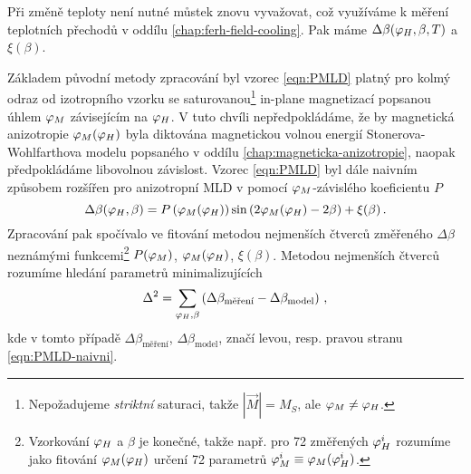 Při změně teploty není nutné můstek znovu vyvažovat, což využíváme k měření teplotních přechodů v oddílu \ref{chap:ferh-field-cooling}.
Pak máme $\Delta\beta(\varphi_H, \beta, T)$ a $\xi(\beta)$.

Základem původní metody zpracování byl vzorec \eqref{eqn:PMLD} platný pro kolmý odraz od izotropního vzorku se saturovanou\footnote{Nepožadujeme \emph{striktní} saturaci, takže $|\vec{M}|=M_S$, ale $\varphi_M\neq\varphi_H$.} in-plane magnetizací popsanou úhlem $\varphi_M$ závisejícím na $\varphi_H$.
V tuto chvíli nepředpokládáme, že by magnetická anizotropie $\varphi_M(\varphi_H)$ byla diktována magnetickou volnou energií Stonerova-Wohlfarthova modelu popsaného v oddílu \ref{chap:magneticka-anizotropie}, naopak předpokládáme libovolnou závislost.
Vzorec \eqref{eqn:PMLD} byl dále naivním způsobem rozšířen pro anizotropní MLD v \cite{wohlrathMagnetooptickaCharakterizaceSpintronickych2018} pomocí $\varphi_M$-závislého koeficientu $P$
\begin{equation}
\label{eqn:PMLD-naivni}
    \Delta\beta(\varphi_H, \beta)=P\left(\varphi_M(\varphi_H)\right) \sin\left(2\varphi_M(\varphi_H)-2\beta\right)+\xi(\beta) \,.
\end{equation}
Zpracování pak spočívalo ve fitování metodou nejmenších čtverců změřeného $\Delta\beta$ neznámými funkcemi\footnote{Vzorkování $\varphi_H$ a $\beta$ je konečné, takže např. pro 72 změřených $\varphi_H^i$ rozumíme jako fitování $\varphi_M(\varphi_H)$ určení 72 parametrů $\varphi_M^i\equiv\varphi_M(\varphi_H^i)$.} $P(\varphi_M)$, $\varphi_M(\varphi_H)$, $\xi(\beta)$.
Metodou nejmenších čtverců rozumíme hledání parametrů minimalizujících
\begin{equation}
\label{eqn:}
    \Delta^2 = \sum_{\varphi_H, \beta} \left( \Delta\beta_\textrm{měření} - \Delta\beta_\textrm{model} \right)\,,
\end{equation}
kde v tomto případě $\Delta\beta_\textrm{měření}$, $\Delta\beta_\textrm{model}$, značí levou, resp. pravou stranu \eqref{eqn:PMLD-naivni}.

